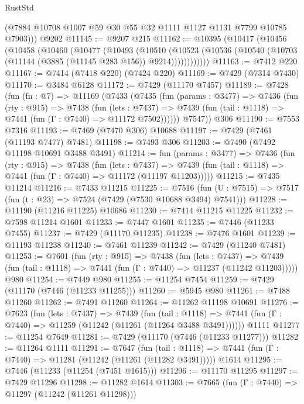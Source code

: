 \begin{lexlean}{RustStd}
\begin{coremodule}
        (@7884 @10708 @1007 @59 @30 @55 @32 @1111 @1127 @1131 @7799 @10785 @7903)))
    @9202
@11145 := @9207 @215
@11162 := @10395
    (@10417
      (@10456
        (@10458
          (@10460
            (@10477
              (@10493
                (@10510
                  (@10523
                    (@10536 (@10540 (@10703 (@11144 (@3885 (@11145 @283 @156)) @9214))))))))))))
@11163 := @7412 @220
@11167 := @7414 (@7418 @220) (@7424 @220)
@11169 := @7429 (@7314 @7430)
@11170 := @3484 @6128
@11172 := @7429 (@11170 @7457)
@11189 := @7428
    (fun (fn : @7) =>
    @11169
      (@7433
        (@7435
          (fun (params : @3477) =>
          @7436
            (fun (rty : @915) =>
            @7438
              (fun (lets : @7437) =>
              @7439 (fun (tail : @1118) => @7441 (fun (Γ : @7440) => @11172 @7502))))))
        @7547))
    @306
@11190 := @7553 @7316
@11193 := @7469 (@7470 @306) @10688
@11197 := @7429 (@7461 (@11193 @7477) @7481)
@11198 := @7493 @306
@11203 := @7490 (@7492 @11198 @10691 @3488 @3491)
@11214 := fun (params : @3477) =>
  @7436
    (fun (rty : @915) =>
    @7438
      (fun (lets : @7437) =>
      @7439 (fun (tail : @1118) => @7441 (fun (Γ : @7440) => @11172 (@11197 @11203)))))
@11215 := @7435 @11214
@11216 := @7433 @11215
@11225 := @7516
    (fun (U : @7515) => @7517 (fun (t : @23) => @7524 (@7429 (@7530 @10688 @3494) @7541)))
@11228 := @11190 (@11216 @11225) @10686
@11230 := @7414 @11215 @11225
@11232 := @7598 @11214 @1601
@11233 := @7447 @1601
@11235 := @7446 (@11233 @7455)
@11237 := @7429 (@11170 @11235)
@11238 := @7476 @1601
@11239 := @11193 @11238
@11240 := @7461 @11239
@11242 := @7429 (@11240 @7481)
@11253 := @7601
    (fun (rty : @915) =>
    @7438
      (fun (lets : @7437) =>
      @7439 (fun (tail : @1118) => @7441 (fun (Γ : @7440) => @11237 (@11242 @11203)))))
    @980
@11254 := @7449 @980
@11255 := @11254 @7454
@11259 := @7429 (@11170 (@7446 (@11233 @11255)))
@11260 := @5945 @980
@11261 := @7488 @11260
@11262 := @7491 @11260
@11264 := @11262 @11198 @10691
@11276 := @7623
    (fun (lets : @7437) =>
    @7439
      (fun (tail : @1118) =>
      @7441 (fun (Γ : @7440) => @11259 (@11242 (@11261 (@11264 @3488 @3491))))))
    @1111
@11277 := @11254 @7649
@11281 := @7429 (@11170 (@7446 (@11233 @11277)))
@11282 := @11264 @1111
@11291 := @7647
    (fun (tail : @1118) => @7441 (fun (Γ : @7440) => @11281 (@11242 (@11261 (@11282 @3491)))))
    @1614
@11295 := @7446 (@11233 (@11254 (@7451 @1615)))
@11296 := @11170 @11295
@11297 := @7429 @11296
@11298 := @11282 @1614
@11303 := @7665 (fun (Γ : @7440) => @11297 (@11242 (@11261 @11298)))

\end{coremodule}
\end{lexlean}
